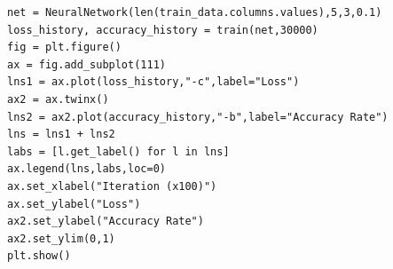\documentclass[a4paper, 11pt]{article}
\begin{document}
\begin{enumerate}
\begin{lstlisting}
net = NeuralNetwork(len(train_data.columns.values),5,3,0.1)
loss_history, accuracy_history = train(net,30000)
fig = plt.figure()
ax = fig.add_subplot(111)
lns1 = ax.plot(loss_history,"-c",label="Loss")
ax2 = ax.twinx()
lns2 = ax2.plot(accuracy_history,"-b",label="Accuracy Rate")
lns = lns1 + lns2
labs = [l.get_label() for l in lns]
ax.legend(lns,labs,loc=0)
ax.set_xlabel("Iteration (x100)")
ax.set_ylabel("Loss")
ax2.set_ylabel("Accuracy Rate")
ax2.set_ylim(0,1)
plt.show()
\end{lstlisting}

\end{enumerate}

%
%
\end{document}
